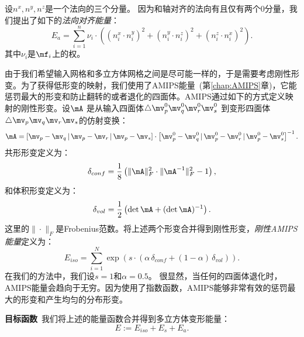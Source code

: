 设$n^x, n^y, n^z$是一个法向的三个分量。 因为和轴对齐的法向有且仅有两个0分量，我们提出了如下的\emph{法向对齐能量}：
\begin{equation}
E_a = \sum_{i=1}^n \nu_i \cdot \left( (n_i^x \cdot n_i^y)^2 + (n_i^y \cdot n_i^z)^2 + (n_i^z \cdot n_i^x)^2 \right).
\end{equation}
其中$\nu_i$是$\mf_i$上的权。

由于我们希望输入网格和多立方体网格之间是尽可能一样的，于是需要考虑刚性形变。为了获得低形变的映射，我们使用了AMIPS能量~\cite{Fu2015}(第\ref{chap:AMIPS}章)，它能惩罚最大的形变和防止翻转的或者退化的四面体。AMIPS通过如下的方式定义映射的刚性形变。设$\mA$ 是从输入四面体$\triangle \mv^0_p\mv^0_q\mv^0_r\mv^0_s$ 到变形四面体$\triangle \mv_p\mv_q\mv_r\mv_s$的仿射变换：
\begin{equation}
\mA = \left[\mv_p-\mv_q \,|\, \mv_p-\mv_r\,|\,\mv_p-\mv_s\right] \cdot \left[\mv^0_p-\mv^0_q \,|\, \mv^0_p-\mv^0_r\,|\,\mv^0_p-\mv^0_s\right]^{-1}.
\end{equation}
共形形变定义为：
\begin{equation}
\delta_{conf} = \frac{1}{8}\left(\|\mA\|^2_F \cdot \|\mA^{-1}\|^2_F -1\right),
\end{equation}
和体积形变定义为：
\begin{equation}
 \delta_{vol} = \frac{1}{2} \left(\det \mA + (\det \mA)^{-1} \right).
\end{equation}
这里的$\|\cdot\|_F$是Frobenius范数。将上述两个形变合并得到刚性形变，\emph{刚性AMIPS能量}定义为：
\begin{equation}
E_{iso} = \sum_{i=1}^N \exp \left( s \cdot \left(\alpha \, \delta_{conf} + (1-\alpha) \, \delta_{vol} \right) \right).
\end{equation}
在我们的方法中，我们设$s=1$和$\alpha = 0.5$。 很显然，当任何的四面体退化时，AMIPS能量会趋向于无穷。因为使用了指数函数，AMIPS能够非常有效的惩罚最大的形变和产生均匀的分布形变。

\textbf{目标函数}\, 我们将上述的能量函数合并得到多立方体变形能量：
\begin{equation}
E := E_{iso} + E_s + E_a.
\end{equation}

